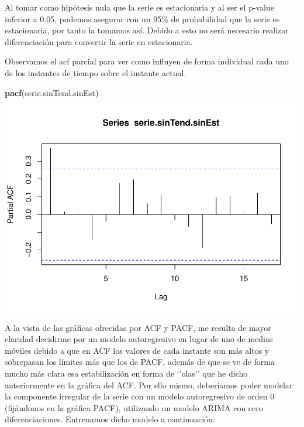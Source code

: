 \documentclass[]{article}
\newenvironment{Shaded}{\begin{snugshade}}{\end{snugshade}}
\newcommand{\KeywordTok}[1]{\textcolor[rgb]{0.13,0.29,0.53}{\textbf{#1}}}
\newcommand{\NormalTok}[1]{#1}
\begin{document}
Al tomar como hipótesis nula que la serie es estacionaria y al ser el
p-value inferior a 0.05, podemos asegurar con un 95\% de probabilidad
que la serie es estacionaria, por tanto la tomamos así. Debido a esto no
será necesario realizar diferenciación para convertir la serie en
estacionaria.

Observamos el acf parcial para ver como influyen de forma individual
cada uno de los instantes de tiempo sobre el instante actual.

\begin{Shaded}
\begin{Highlighting}[]
\KeywordTok{pacf}\NormalTok{(serie.sinTend.sinEst)}
\end{Highlighting}
\end{Shaded}

\includegraphics{timeSeries_files/figure-latex/unnamed-chunk-23-1.pdf}

A la vista de las gráficas ofrecidas por ACF y PACF, me resulta de mayor
claridad decidirme por un modelo autoregresivo en lugar de uno de medias
móviles debido a que en ACF los valores de cada instante son más altos y
sobrepasan los límites más que los de PACF, además de que se ve de forma
mucho más clara esa estabilización en forma de `'olas'' que he dicho
anteriormente en la gráfica del ACF. Por ello mismo, deberíamos poder
modelar la componente irregular de la serie con un modelo autoregresivo
de orden 0 (fijándonos en la gráfica PACF), utilizando un modelo ARIMA
con cero diferenciaciones. Entrenamos dicho modelo a continuación:
\end{document}
